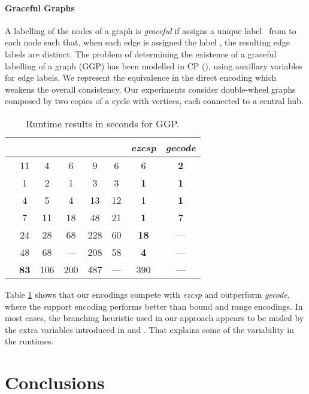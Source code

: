 \documentclass[letterpaper]{article}
\newcommand{\systemname}[1]{\textit{#1}}
\newcommand{\encsup}{}
\newcommand{\encbou}{}
\newcommand{\encran}{}
\newcommand{\encbouh}[1]{\encbou}
\newcommand{\citeap}[1]{\citeauthor{#1} (\citeyear{#1})}
\begin{document}
\paragraph{Graceful Graphs}
A labelling  of the nodes of a graph  is \emph{graceful} if  assigns a unique label~ from  to each node  such that, when each edge  is assigned the label , the resulting edge labels are distinct. The problem of determining the existence of a graceful labelling of a graph (GGP) has been modelled in CP \citeap{pesm03a}, using auxillary variables  for edge labels. We represent the equivalence  in the direct encoding which weakens the overall consistency. Our experiments consider double-wheel graphs  composed by two copies of a cycle with  vertices, each connected to a central hub.
\begin{table}
\centering
\begin{tabular}{cccccccc} \hline\hline
 & \encsup & \encbouh{1} & \encbouh{3} & \encbou & \encran & \systemname{ezcsp} & \systemname{gecode} \\ \hline
 & 11 &  4 &  6 &  9 &  6 & 6 & \textbf{2} \\
 &  1 &  2 &  1 &  3 &  3 & \textbf{1} & \textbf{1} \\
 &  4 &  5 &  4 & 13 & 12 & 1 & \textbf{1} \\
 &  7 & 11 & 18 & 48 & 21 & \textbf{1} & 7 \\
 & 24 & 28 & 68 &228 & 60 & \textbf{18} & --- \\
 & 48 & 68 & ---  &208 & 58 & \textbf{4} & --- \\
 & \textbf{83} &106 &200 &487 & ---  & 390 & --- \\ \hline\hline
\end{tabular}
\caption{Runtime results in seconds for GGP. \label{tab:ggp}}
\vspace{-1\baselineskip}
\end{table}
Table \ref{tab:ggp} shows that our encodings compete with \systemname{ezcsp} and outperform \systemname{gecode}, where the support encoding performs better than bound and range encodings. In most cases, the branching heuristic used in our approach appears to be misled by the extra variables introduced in  and . That explains some of the variability in the runtimes.


\section{Conclusions}
\end{document}
